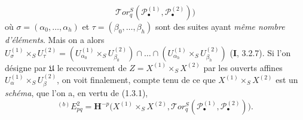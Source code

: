 \begin{env}[6.6.4]
\[    \mathscr{T}\!or_q^S
    (\mathscr P_\bullet^{(1)},\mathscr P_\bullet^{(2)})\bigr)
\]
où $\sigma=(\alpha_0,\ldots,\alpha_h)$ et
$\tau=(\beta_0,\ldots,\beta_h)$ sont des suites ayant \emph{même nombre d'éléments}.
Mais on a alors
$U_\sigma^{(1)}\times_S U_\tau^{(2)}
=(U_{\alpha_0}^{(1)}\times_S U_{\beta_0}^{(2)})\cap\ldots\cap
(U_{\alpha_h}^{(1)}\times_S U_{\beta_h}^{(2)})$
(\textbf{I}, 3.2.7).
Si l'on désigne par $\mathfrak U$ le recouvrement de
$Z=X^{(1)}\times_S X^{(2)}$ par les ouverts affines
$U_\alpha^{(1)}\times_S U_\beta^{(2)}$, on voit finalement, compte tenu de ce
que $X^{(1)}\times_S X^{(2)}$ est un \emph{schéma}, que l'on a, en vertu de (1.3.1),
\[
  {}^{(b)}E_{pq}^2
  =\mathbf H^{-p}\bigl(X^{(1)}\times_S X^{(2)},
    \mathscr{T}\!or_q^S
    (\mathscr P_\bullet^{(1)},\mathscr P_\bullet^{(2)})\bigr).
\]


\end{env}
